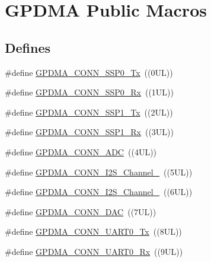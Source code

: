 \hypertarget{group___g_p_d_m_a___public___macros}{\section{\-G\-P\-D\-M\-A \-Public \-Macros}
\label{group___g_p_d_m_a___public___macros}
}
\subsection*{\-Defines}
\begin{DoxyCompactItemize}
\item 
\#define \hyperlink{group___g_p_d_m_a___public___macros_gab7a01050fe30674fa02bd3e9c1976819}{\-G\-P\-D\-M\-A\-\_\-\-C\-O\-N\-N\-\_\-\-S\-S\-P0\-\_\-\-Tx}~((0\-U\-L))
\item 
\#define \hyperlink{group___g_p_d_m_a___public___macros_ga35a189ac8738430fd2f0e83147483b39}{\-G\-P\-D\-M\-A\-\_\-\-C\-O\-N\-N\-\_\-\-S\-S\-P0\-\_\-\-Rx}~((1\-U\-L))
\item 
\#define \hyperlink{group___g_p_d_m_a___public___macros_ga05070551cd6af4e9a24775acfb5aacb5}{\-G\-P\-D\-M\-A\-\_\-\-C\-O\-N\-N\-\_\-\-S\-S\-P1\-\_\-\-Tx}~((2\-U\-L))
\item 
\#define \hyperlink{group___g_p_d_m_a___public___macros_ga092169323edc65111c38376bded8ace4}{\-G\-P\-D\-M\-A\-\_\-\-C\-O\-N\-N\-\_\-\-S\-S\-P1\-\_\-\-Rx}~((3\-U\-L))
\item 
\#define \hyperlink{group___g_p_d_m_a___public___macros_ga4c5af6d4e3a086402698cf6ddccf3ced}{\-G\-P\-D\-M\-A\-\_\-\-C\-O\-N\-N\-\_\-\-A\-D\-C}~((4\-U\-L))
\item 
\#define \hyperlink{group___g_p_d_m_a___public___macros_ga90ebc299480d3580d4595bb10880d048}{\-G\-P\-D\-M\-A\-\_\-\-C\-O\-N\-N\-\_\-\-I2\-S\-\_\-\-Channel\-\_}~((5\-U\-L))
\item 
\#define \hyperlink{group___g_p_d_m_a___public___macros_ga02ab0793287393e1ac49f3730635443c}{\-G\-P\-D\-M\-A\-\_\-\-C\-O\-N\-N\-\_\-\-I2\-S\-\_\-\-Channel\-\_}~((6\-U\-L))
\item 
\#define \hyperlink{group___g_p_d_m_a___public___macros_ga70d1a4fd7a27ad318e4f4d30a3e8e78d}{\-G\-P\-D\-M\-A\-\_\-\-C\-O\-N\-N\-\_\-\-D\-A\-C}~((7\-U\-L))
\item 
\#define \hyperlink{group___g_p_d_m_a___public___macros_gae2c7927807bbdd634bc1529dc9bce524}{\-G\-P\-D\-M\-A\-\_\-\-C\-O\-N\-N\-\_\-\-U\-A\-R\-T0\-\_\-\-Tx}~((8\-U\-L))
\item 
\#define \hyperlink{group___g_p_d_m_a___public___macros_ga2cb76be0ac39a2b019135810039376aa}{\-G\-P\-D\-M\-A\-\_\-\-C\-O\-N\-N\-\_\-\-U\-A\-R\-T0\-\_\-\-Rx}~((9\-U\-L))

\end{DoxyCompactItemize}
